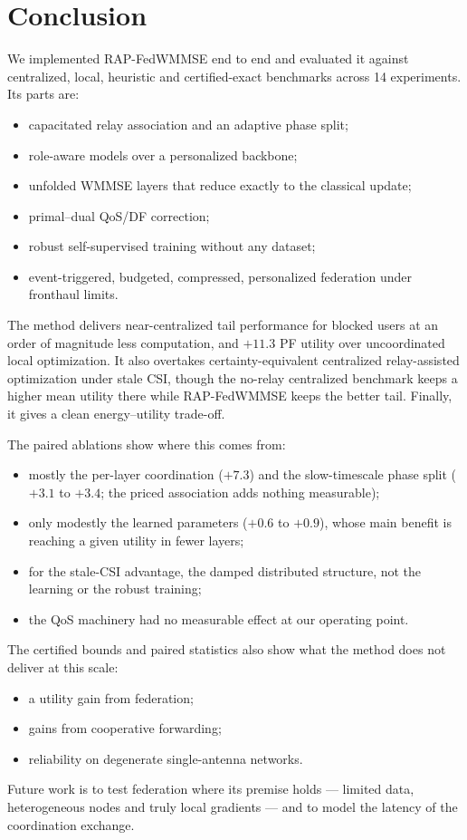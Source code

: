\documentclass[conference]{IEEEtran}
\begin{document}
\section{Conclusion}
We implemented RAP-FedWMMSE end to end and evaluated it against centralized,
local, heuristic and certified-exact benchmarks across 14 experiments. Its
parts are:
\begin{itemize}
  \item capacitated relay association and an adaptive phase split;
  \item role-aware models over a personalized backbone;
  \item unfolded WMMSE layers that reduce exactly to the classical update;
  \item primal--dual QoS/DF correction;
  \item robust self-supervised training without any dataset;
  \item event-triggered, budgeted, compressed, personalized federation under
    fronthaul limits.
\end{itemize}
The method delivers near-centralized tail performance for blocked users at
an order of magnitude less computation, and $+11.3$ PF utility over
uncoordinated local optimization. It also overtakes certainty-equivalent
centralized relay-assisted optimization under stale CSI, though the no-relay
centralized benchmark keeps a higher mean utility there while RAP-FedWMMSE
keeps the better tail. Finally, it gives a clean energy--utility trade-off.

The paired ablations show where this comes from:
\begin{itemize}
  \item mostly the per-layer coordination ($+7.3$) and the slow-timescale
    phase split ($+3.1$ to $+3.4$; the priced association adds nothing
    measurable);
  \item only modestly the learned parameters ($+0.6$ to $+0.9$), whose main
    benefit is reaching a given utility in fewer layers;
  \item for the stale-CSI advantage, the damped distributed structure, not
    the learning or the robust training;
  \item the QoS machinery had no measurable effect at our operating point.
\end{itemize} The certified bounds and paired
statistics also show what the method does not deliver at this scale:
\begin{itemize}
  \item a utility gain from federation;
  \item gains from cooperative forwarding;
  \item reliability on degenerate single-antenna networks.
\end{itemize}
Future work is to test federation where its premise holds --- limited data,
heterogeneous nodes and truly local gradients --- and to model the latency of
the coordination exchange.
\end{document}
